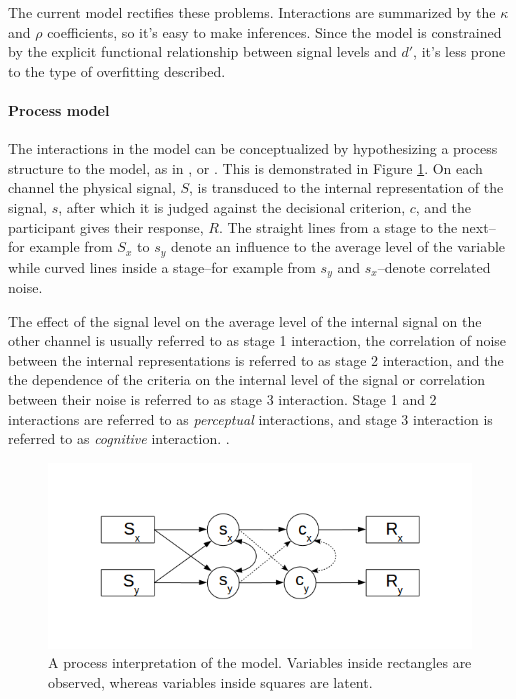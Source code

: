 \documentclass{article}\usepackage{knitr}
\begin{document}
The current model rectifies these problems. Interactions are summarized by the $\kappa$ and $\rho$ coefficients, so it's easy to make inferences. Since the model is constrained by the explicit functional relationship between signal levels and $d'$, it's less prone to the type of overfitting described. 

\paragraph{Process model}

The interactions in the model can be conceptualized by hypothesizing a process structure to the model, as in \cite{ashby1989}, \cite{ashby2000} or \cite{cohen2003}. This is demonstrated in Figure \ref{fig:GRTprocess}. On each channel the physical signal, $S$, is transduced to the internal representation of the signal, $s$, after which it is judged against the decisional criterion, $c$, and the participant gives their response, $R$. The straight lines from a stage to the next--for example from $S_x$ to $s_y$ denote an influence to the average level of the variable while curved lines inside a stage--for example from $s_y$ and $s_x$--denote correlated noise. 

The effect of the signal level on the average level of the internal signal on the other channel is usually referred to as stage 1 interaction, the correlation of noise between the internal representations is referred to as stage 2 interaction, and the the dependence of the criteria on the internal level of the signal or correlation between their noise is referred to as stage 3 interaction. Stage 1 and 2 interactions are referred to as \textit{perceptual} interactions, and stage 3 interaction is referred to as \textit{cognitive} interaction. \citep{ashby1989, ashby2000, cohen2003}. 

\begin{figure}[!htb]
\centering
\includegraphics[scale = 0.8]{Process_model}
\caption{A process interpretation of the model. Variables inside rectangles are observed, whereas variables inside squares are latent. }
\label{fig:GRTprocess}
\end{figure}
\end{document}
